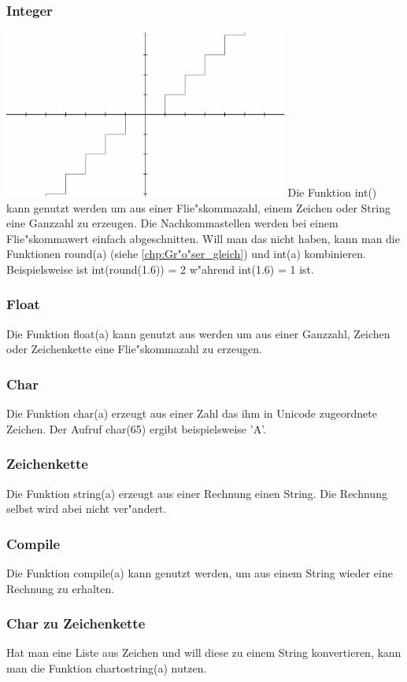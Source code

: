 \documentclass{scrartcl}
\begin{document}
\subsubsection{Integer}
\includegraphics[width=0.7\textwidth]{images/functions/integer.png}\newline
Die Funktion int() kann genutzt werden um aus einer Flie"skommazahl, einem Zeichen oder String eine Ganzzahl zu erzeugen. Die Nachkommastellen werden bei einem Flie"skommawert einfach abgeschnitten. Will man das nicht haben, kann man die Funktionen round(a) (siehe \ref{chp:Gr"o"ser_gleich}) und int(a) kombinieren. Beispielsweise ist int(round(1.6)) = 2 w"ahrend int(1.6) = 1 ist.
\subsubsection{Float}
Die Funktion float(a) kann genutzt aus werden um aus einer Ganzzahl, Zeichen oder Zeichenkette eine Flie"skommazahl zu erzeugen.
\subsubsection{Char}
Die Funktion char(a) erzeugt aus einer Zahl das ihm in Unicode zugeordnete Zeichen. Der Aufruf char(65) ergibt beispielsweise 'A'.
\subsubsection{Zeichenkette}
Die Funktion string(a) erzeugt aus einer Rechnung einen String. Die Rechnung selbst wird abei nicht ver"andert.
\subsubsection{Compile}
Die Funktion compile(a) kann genutzt werden, um aus einem String wieder eine Rechnung zu erhalten.
\subsubsection{Char zu Zeichenkette}
Hat man eine Liste aus Zeichen und will diese zu einem String konvertieren, kann man die Funktion chartostring(a) nutzen.
\end{document}
